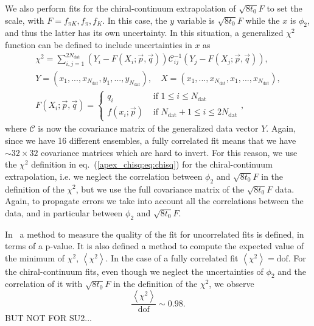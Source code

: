 We also perform fits for the chiral-continuum extrapolation of $\sqrt{8t_0}F$ to set the scale, with $F=f_{\pi K},f_{\pi},f_K$. In this case, the $y$ variable is $\sqrt{8t_0}F$ while the $x$ is $\phi_2$, and thus the latter has its own uncertainty. In this situation, a generalized $\chi^2$ function can be defined to include uncertainties in $x$ as
\begin{gather}
\label{apex_chisq:eq:chisq_generalized}
\chi^2=\sum_{i,j=1}^{2N_{\textrm{dat}}}\left(Y_i-F(X_i;\vec{p},\vec{q})\right)\mathcal{C}_{ij}^{-1}\left(Y_j-F(X_j;\vec{p},\vec{q})\right), \\
Y=(x_1,...,x_{N_{\textrm{dat}}},y_1,...,y_{N_{\textrm{dat}}}), \quad
X=(x_1,...,x_{N_{\textrm{dat}}},x_1,...,x_{N_{\textrm{dat}}}), \\
F(X_i;\vec{p},\vec{q})=\left\{\begin{matrix}
q_i & \textrm{ if $1\leq i\leq N_{\textrm{dat}}$} \\ 
f(x_i;\vec{p}) & \textrm{ if $N_{\textrm{dat}}+1\leq i\leq 2N_{\textrm{dat}}$}
\end{matrix}\right.,
\end{gather}
where $\mathcal{C}$ is now the covariance matrix of the generalized data vector $Y$. Again, since we have 16 different ensembles, a fully correlated fit means that we have $\sim32\times32$ covariance matrices which are hard to invert. For this reason, we use the $\chi^2$ definition in eq.~(\ref{apex_chisq:eq:chisq}) for the chiral-continuum extrapolation, i.e. we neglect the correlation between $\phi_2$ and $\sqrt{8t_0}F$ in the definition of the $\chi^2$, but we use the full covariance matrix of the $\sqrt{8t_0}F$ data. Again, to propagate errors we take into account all the correlations between the data, and in particular between $\phi_2$ and $\sqrt{8t_0}F$.

In~\citep{Bruno:2022mfy} a method to measure the quality of the fit for uncorrelated fits is defined, in terms of a p-value. It is also defined a method to compute the expected value of the minimum of $\chi^2$, $\left<\chi^2\right>$. In the case of a fully correlated fit $\left<\chi^2\right>={\textrm{dof}}$. For the chiral-continuum fits, even though we neglect the uncertainties of $\phi_2$ and the correlation of it with $\sqrt{8t_0}F$ in the definition of the $\chi^2$, we observe
\begin{equation}
\frac{\left<\chi^2\right>}{{\textrm{dof}}}\sim0.98.
\end{equation}
BUT NOT FOR SU2...


